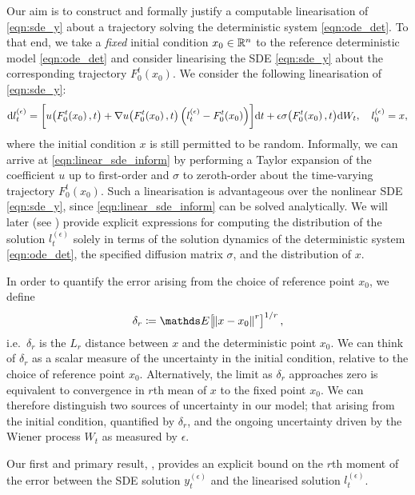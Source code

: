 Our aim is to construct and formally justify a computable linearisation of \cref{eqn:sde_y} about a trajectory solving the deterministic system \cref{eqn:ode_det}.
To that end, we take a \emph{fixed} initial condition \(x_0 \in \mathbb{R}^n\) to the reference deterministic model \cref{eqn:ode_det} and consider linearising the SDE \cref{eqn:sde_y} about the corresponding trajectory \(F_0^t\!\left(x_0\right)\).
We consider the following linearisation of \cref{eqn:sde_y}:
\begin{equation}
	\dif l_t^{(\epsilon)} = \left[u\!\left(F_0^t\!\left(x_0\right), t\right) + \nabla u\!\left(F_0^t\!\left(x_0\right), t\right)\left(l_t^{(\epsilon)} - F_0^t\!\left(x_0\right)\right)\right] \! \dif t + \epsilon\sigma\!\left(F_0^t\!\left(x_0\right), t\right) \! \dif W_t, \quad l_0^{(\epsilon)} = x,
	\label{eqn:linear_sde_inform}
\end{equation}
where the initial condition \(x \) is still permitted to be random.
Informally, we can arrive at \cref{eqn:linear_sde_inform} by performing a Taylor expansion of the coefficient \(u\) up to first-order and \(\sigma\) to zeroth-order about the time-varying trajectory \(F_0^t\!\left(x_0\right)\).
Such a linearisation is advantageous over the nonlinear SDE \cref{eqn:sde_y}, since \cref{eqn:linear_sde_inform} can be solved analytically.
We will later (see ) provide explicit expressions for computing the distribution of the solution \(l_t^{(\epsilon)}\) solely in terms of the solution dynamics of the deterministic system \cref{eqn:ode_det}, the specified diffusion matrix \(\sigma\), and the distribution of \(x\).


In order to quantify the error arising from the choice of reference point \(x_0\), we define
\[
	\delta_r \coloneqq \avg{\norm{x - x_0}^r}^{1/r},
\]
i.e.\ \(\delta_r\) is the \(L_r\) distance between \(x\) and the deterministic point \(x_0\).
We can think of \(\delta_r\) as a scalar measure of the uncertainty in the initial condition, relative to the choice of reference point \(x_0\).
Alternatively, the limit as \(\delta_r\) approaches zero is equivalent to convergence in \(r\)th mean of \(x\) to the fixed point \(x_0\).
We can therefore distinguish two sources of uncertainty in our model; that arising from the initial condition, quantified by \(\delta_r\), and the ongoing uncertainty driven by the Wiener process \(W_t\) as measured by \(\epsilon\).

Our first and primary result, , provides an explicit bound on the \(r\)th moment of the error between the SDE solution \(y_t^{(\epsilon)}\) and the linearised solution \(l_t^{(\epsilon)}\).


